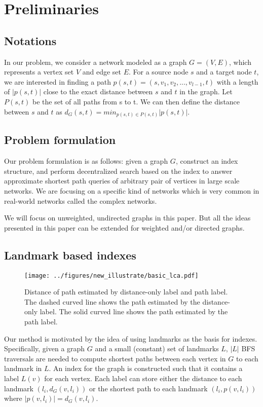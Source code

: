 \section{Preliminaries}
\label{preliminary}

\subsection{Notations}
In our problem, we consider a network modeled as a graph $G = (V,E)$, which represents a vertex set $V$ and edge set $E$. For a source node $s$ and a target node $t$, we are interested in finding a path $p(s,t)=(s,v_1,v_2,...,v_{l-1},t)$ with a length of $|p(s,t)|$ close to the exact distance between $s$ and $t$ in the graph. Let $P(s,t)$ be the set of all paths from s to t. We can then define the distance between $s$ and $t$ as $d_G(s,t) = min_{p(s,t) \in P(s,t)}|p(s,t)|$.

\subsection{Problem formulation}

Our problem formulation is as follows: given a graph $G$, construct an index structure, and perform decentralized search based on the index to answer approximate shortest path queries of arbitrary pair of vertices in large scale networks. We are focusing on a specific kind of networks which is very common in real-world networks called the complex networks.

We will focus on unweighted, undirected graphs in this paper. But all the ideas presented in this paper can be extended for weighted and/or directed graphs.

\subsection{Landmark based indexes}

\begin{figure}[t]
    \centering
    \texttt{[image: ../figures/new\_illustrate/basic\_lca.pdf]}
    \caption{Distance of path estimated by distance-only label and path label. The dashed curved line shows the path estimated by the distance-only label. The solid curved line shows the path estimated by the path label.}
    \label{fig:basic_lca}
\end{figure}

Our method is motivated by the idea of using landmarks as the basis for indexes. Specifically, given a graph $G$ and a small (constant) set of landmarks $L$, $|L|$ BFS traversals are needed to compute shortest paths between each vertex in $G$ to each landmark in $L$. An index for the graph is constructed such that it contains a label $L(v)$ for each vertex. Each label can store either the distance to each landmark $(l_i, d_G(v,l_i))$ or the shortest path to each landmark $(l_i, p(v,l_i))$ where $|p(v,l_i)| = d_G(v,l_i)$.

